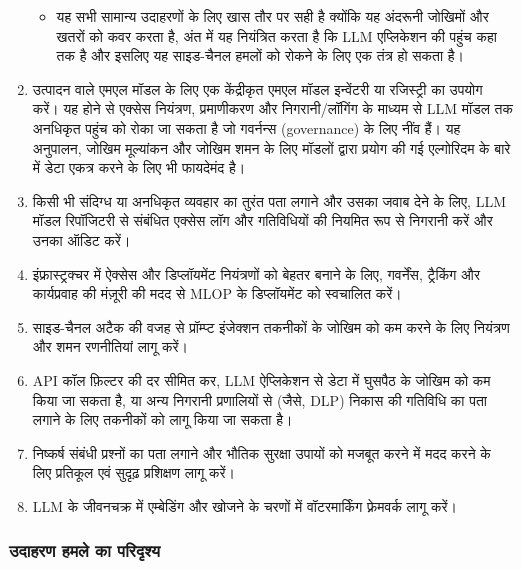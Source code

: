 \documentclass[
]{article}
\providecommand{\tightlist}{%
  \setlength{\itemsep}{0pt}\setlength{\parskip}{0pt}}
\begin{document}
\begin{enumerate}
  \begin{itemize}
  \tightlist
  \item
    यह सभी सामान्य उदाहरणों के लिए खास तौर पर सही है क्योंकि यह अंदरूनी जोखिमों
    और खतरों को कवर करता है, अंत में यह नियंत्रित करता है कि LLM एप्लिकेशन की पहुंच
    कहा तक है और इसलिए यह साइड-चैनल हमलों को रोकने के लिए एक तंत्र हो सकता है।
  \end{itemize}
\item
  उत्पादन वाले एमएल मॉडल के लिए एक केंद्रीकृत एमएल मॉडल इन्वेंटरी या रजिस्ट्री का
  उपयोग करें। यह होने से एक्सेस नियंत्रण, प्रमाणीकरण और निगरानी/लॉगिंग के माध्यम से
  LLM मॉडल तक अनधिकृत पहुंच को रोका जा सकता है जो गवर्नन्स (governance) के लिए
  नींव हैं। यह अनुपालन, जोखिम मूल्यांकन और जोखिम शमन के लिए मॉडलों द्वारा प्रयोग की
  गई एल्गोरिदम के बारे में डेटा एकत्र करने के लिए भी फायदेमंद है।
\item
  किसी भी संदिग्ध या अनधिकृत व्यवहार का तुरंत पता लगाने और उसका जवाब देने के लिए,
  LLM मॉडल रिपॉजिटरी से संबंधित एक्सेस लॉग और गतिविधियों की नियमित रूप से
  निगरानी करें और उनका ऑडिट करें।
\item
  इंफ्रास्ट्रक्चर में ऐक्सेस और डिप्लॉयमेंट नियंत्रणों को बेहतर बनाने के लिए, गवर्नेंस, ट्रैकिंग
  और कार्यप्रवाह की मंज़ूरी की मदद से MLOP के डिप्लॉयमेंट को स्वचालित करें।
\item
  साइड-चैनल अटैक की वजह से प्रॉम्प्ट इंजेक्शन तकनीकों के जोखिम को कम करने के लिए
  नियंत्रण और शमन रणनीतियां लागू करें।
\item
  API कॉल फ़िल्टर की दर सीमित कर, LLM ऐप्लिकेशन से डेटा में घुसपैठ के जोखिम को कम
  किया जा सकता है, या अन्य निगरानी प्रणालियों से (जैसे, DLP) निकास की गतिविधि
  का पता लगाने के लिए तकनीकों को लागू किया जा सकता है।
\item
  निष्कर्ष संबंधी प्रश्नों का पता लगाने और भौतिक सुरक्षा उपायों को मजबूत करने में मदद
  करने के लिए प्रतिकूल एवं सुदृढ़ प्रशिक्षण लागू करें।
\item
  LLM के जीवनचक्र में एम्बेडिंग और खोजने के चरणों में वॉटरमार्किंग फ़्रेमवर्क लागू करें।
\end{enumerate}

\subsubsection{उदाहरण हमले का
परिदृश्य}\label{ux909ux926ux939ux930ux923-ux939ux92eux932-ux915-ux92aux930ux926ux936ux92f}
\end{document}
